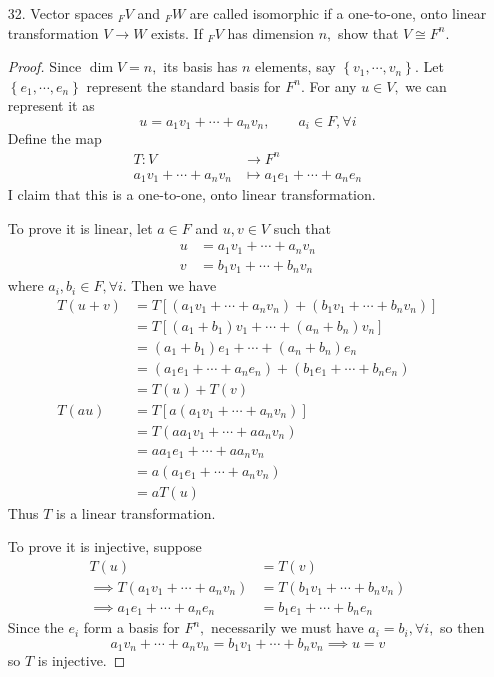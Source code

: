 \documentclass{article}
\begin{document}
\begin{itemize}
		\newpage
	\item[32.] Vector spaces $_F V$ and $_F W$ are called isomorphic if a one-to-one, onto linear transformation $V\to W$ exists. If $_F V$ has dimension $n,$ show that $V\cong F^n.$
		\begin{proof}
			Since $\dim V=n,$ its basis has $n$ elements, say $\left\{ v_1, \cdots, v_n \right\}.$ Let $\left\{ e_1, \cdots, e_n \right\}$ represent the standard basis for $F^n.$ For any $u\in V,$ we can represent it as
			\[u = a_1v_1+\cdots+a_nv_n, \quad\quad a_i\in F, \forall i\]
			Define the map
			\begin{align*}
				T:V&\to F^n \\
				a_1v_1+\cdots+a_nv_n &\mapsto a_1e_1+\cdots+a_ne_n
			\end{align*}
			I claim that this is a one-to-one, onto linear transformation. 

			To prove it is linear, let $a\in F$ and $u, v\in V$ such that 
			\begin{align*}
				u &= a_1v_1 + \cdots + a_nv_n \\
				v &= b_1v_1 + \cdots + b_nv_n
			\end{align*}
			where $a_i, b_i\in F, \forall i.$ Then we have
			\begin{align*}
				T(u+v) &= T\left[ (a_1v_1+\cdots+a_nv_n) + (b_1v_1+\cdots+b_nv_n) \right] \\
				&= T\left[ (a_1+b_1)v_1 + \cdots + (a_n+b_n)v_n \right] \\
				&= (a_1+b_1)e_1 + \cdots + (a_n+b_n)e_n \\
				&= \left( a_1e_1 + \cdots + a_ne_n \right) + \left( b_1e_1+\cdots+b_ne_n \right) \\
				&= T(u) + T(v) \\
				T(au) &= T\left[ a(a_1v_1+\cdots+a_nv_n) \right] \\
				&= T(aa_1v_1 + \cdots + aa_nv_n) \\
				&= aa_1e_1 + \cdots + aa_nv_n \\
				&= a(a_1e_1 + \cdots + a_nv_n) \\
				&= aT(u)
			\end{align*}
			Thus $T$ is a linear transformation.

			To prove it is injective, suppose
			\begin{align*}
				T(u) &= T(v) \\
				\implies T(a_1v_1 + \cdots +a_nv_n) &= T(b_1v_1 + \cdots + b_nv_n) \\
				\implies a_1e_1 + \cdots + a_ne_n &= b_1e_1 + \cdots + b_ne_n
			\end{align*}
			Since the $e_i$ form a basis for $F^n,$ necessarily we must have $a_i=b_i, \forall i,$ so then
			\[a_1v_n + \cdots + a_nv_n = b_1v_1 + \cdots + b_nv_n\implies u=v\]
			so $T$ is injective.


\end{proof}
\end{itemize}
\end{document}
